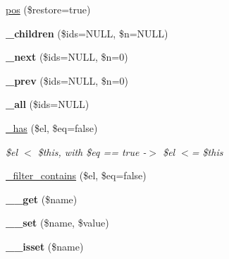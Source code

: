 \begin{DoxyCompactItemize}
\item 
\mbox{\hyperlink{classduzun_1_1hQuery_1_1Node_a781a7e7f2540c4787915407279683e6f}{pos}} (\$restore=true)
\item 
\mbox{\label{classduzun_1_1hQuery_1_1Node_a976e110ec37647d0f035b571a82e26f5}} 
{\bfseries \+\_\+children} (\$ids=N\+U\+LL, \$n=N\+U\+LL)
\item 
\mbox{\label{classduzun_1_1hQuery_1_1Node_a333630c8d0599d3db1aa004ef13bf210}} 
{\bfseries \+\_\+next} (\$ids=N\+U\+LL, \$n=0)
\item 
\mbox{\label{classduzun_1_1hQuery_1_1Node_a0d542ee549f179d88b171e470d1b6eba}} 
{\bfseries \+\_\+prev} (\$ids=N\+U\+LL, \$n=0)
\item 
\mbox{\label{classduzun_1_1hQuery_1_1Node_a3f1e8507527acd831a85b0fba9587188}} 
{\bfseries \+\_\+all} (\$ids=N\+U\+LL)
\item 
\mbox{\label{classduzun_1_1hQuery_1_1Node_a3d6209fff4e1d00a9feb2a4249dc91cf}} 
\mbox{\hyperlink{classduzun_1_1hQuery_1_1Node_a3d6209fff4e1d00a9feb2a4249dc91cf}{\+\_\+has}} (\$el, \$eq=false)
\begin{DoxyCompactList}\small\item\em \$el $<$ \$this, with \$eq == true -\/$>$ \$el $<$= \$this \end{DoxyCompactList}\item 
\mbox{\hyperlink{classduzun_1_1hQuery_1_1Node_a4419fd0f30515d4eb5cad2bfe7979754}{\+\_\+filter\+\_\+contains}} (\$el, \$eq=false)
\item 
\mbox{\label{classduzun_1_1hQuery_1_1Node_a4038899dd8df17a881ac01516b3d6188}} 
{\bfseries \+\_\+\+\_\+get} (\$name)
\item 
\mbox{\label{classduzun_1_1hQuery_1_1Node_a9efe1826a38072a24f1575e6257cb4f3}} 
{\bfseries \+\_\+\+\_\+set} (\$name, \$value)
\item 
\mbox{\label{classduzun_1_1hQuery_1_1Node_a1aefdca7ea3af865a3a95abb27ef4e10}} 
{\bfseries \+\_\+\+\_\+isset} (\$name)

\end{DoxyCompactItemize}
